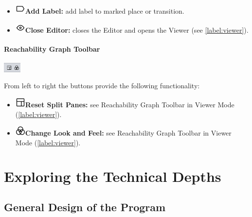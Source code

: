 \documentclass[10pt, a4paper]{article}
\begin{document}
\begin{itemize}
\item\includegraphics[scale=0.4]{../resources/images/Toolbar/label.png}\hspace{0.1cm}\textbf{Add Label:} add label to marked place or transition.
\item\includegraphics[scale=0.4]{../resources/images/Toolbar/eye.png}\hspace{0.1cm}\textbf{Close Editor:} closes the Editor and opens the Viewer (see \ref{label:viewer}).
\end{itemize}


\paragraph{Reachability Graph Toolbar}

\includegraphics[height=0.5cm]{Editor_Reachability.png}

From left to right the buttons provide the following functionality:
\begin{itemize}
\item\includegraphics[scale=0.4]{../resources/images/Toolbar/layout.png}\hspace{0.1cm}\textbf{Reset Split Panes:} see Reachability Graph Toolbar in Viewer Mode (\ref{label:viewer}).
\item\includegraphics[scale=0.4]{../resources/images/Toolbar/design.png}\hspace{0.1cm}\textbf{Change Look and Feel:} see Reachability Graph Toolbar in Viewer Mode (\ref{label:viewer}).
\end{itemize}


\section{Exploring the Technical Depths}


\subsection{General Design of the Program}
\end{document}
